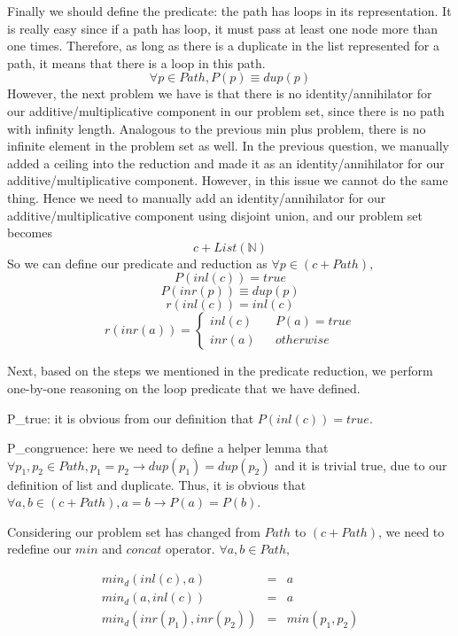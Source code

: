 \documentclass[a4paper,12pt,twoside,openright]{report}
\newcommand{\e}[2]{
\begin{equation}
  \label{#1} 
  #2
\end{equation}
}
\begin{document}
Finally we should define the predicate: the path has loops in its representation. It is really easy since if a path has loop, it must pass at least one node more than one times. 
Therefore, as long as there is a duplicate in the list represented for a path, it means that there is a loop in this path.
\[\forall p \in Path, P(p) \equiv dup(p)\]
However, the next problem we have is that there is no identity/annihilator for our additive/multiplicative component in our problem set, since there is no path with infinity length.
Analogous to the previous min plus problem, there is no infinite element in the problem set as well. In the previous question, we manually added a ceiling into the reduction and made it as an identity/annihilator for our additive/multiplicative component. However, in this issue we cannot do the same thing. 
Hence we need to manually add an identity/annihilator for our additive/multiplicative component using disjoint union, and our problem set becomes \[c + List(\mathbb{N})\]
So we can define our predicate and reduction as $\forall p \in (c + Path),$
\[ P(inl(c)) = true\]
\[ P(inr(p)) \equiv dup(p)\]
\[ r(inl(c)) = inl(c)\]
\[
r(inr (a)) =
\left\{
\begin{aligned}
inl(c) &  & P(a) = true \\
inr(a) &  & otherwise 
\end{aligned}
\right.\]

Next, based on the steps we mentioned in the predicate reduction, we perform one-by-one reasoning on the loop predicate that we have defined.

P\_true: it is obvious from our definition that $P(inl(c)) = true$.

P\_congruence: here we need to define a helper lemma that $\forall p_1,p_2 \in Path, p_1 = p_2 \rightarrow dup(p_1) = dup(p_2)$ and it is trivial true, due to our definition of list and duplicate. 
Thus, it is obvious that $\forall a,b \in (c + Path), a = b \rightarrow P(a) = P(b)$.

Considering our problem set has changed from $Path$ to $(c + Path)$, we need to redefine our $min$ and $concat$ operator. $\forall a,b \in Path,$
\e{pf:def:elementary_path_min_d}{
\begin{array}{rcl}
min_d(inl(c),a)	 & = & a \\
min_d(a,inl(c))	 & = & a \\
min_d(inr(p_1),inr(p_2))	 & = & min(p_1,p_2)\\
\end{array}
}
\end{document}

